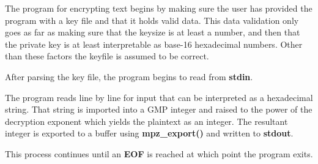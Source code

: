 The program for encrypting text begins by making sure the user has provided the program with a key file and that it holds valid data.
This data validation only goes as far as making sure that the keysize is at least a number, and then that the private key is at least interpretable as base-16 hexadecimal numbers. 
Other than these factors the keyfile is assumed to be correct.


After parsing the key file, the program begins to read from \textbf{stdin}. 

The program reads line by line for input that can be interpreted as a hexadecimal string.
That string is imported into a GMP integer and raised to the power of the decryption exponent which yields the plaintext as an integer.
The resultant integer is exported to a buffer using \textbf{mpz\_export()} and written to \textbf{stdout}.

This process continues until an \textbf{EOF} is reached at which point the program exits.
